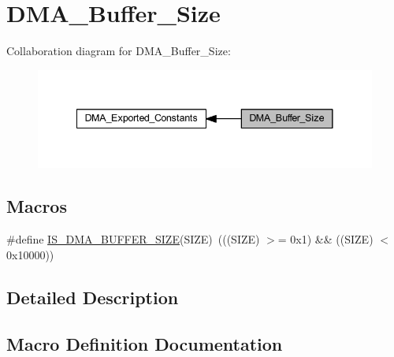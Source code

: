 \hypertarget{group___d_m_a___buffer___size}{}\section{D\+M\+A\+\_\+\+Buffer\+\_\+\+Size}
\label{group___d_m_a___buffer___size}
Collaboration diagram for D\+M\+A\+\_\+\+Buffer\+\_\+\+Size\+:
\nopagebreak
\begin{figure}[H]
\begin{center}
\leavevmode
\includegraphics[width=341pt]{group___d_m_a___buffer___size}
\end{center}
\end{figure}
\subsection*{Macros}
\begin{DoxyCompactItemize}
\item 
\#define \hyperlink{group___d_m_a___buffer___size_ga72ef4033bb3bc2cdfdbe579083b05e32}{I\+S\+\_\+\+D\+M\+A\+\_\+\+B\+U\+F\+F\+E\+R\+\_\+\+S\+I\+ZE}(S\+I\+ZE)~(((S\+I\+ZE) $>$= 0x1) \&\& ((\+S\+I\+Z\+E) $<$ 0x10000))
\end{DoxyCompactItemize}


\subsection{Detailed Description}


\subsection{Macro Definition Documentation}
\mbox{\label{group___d_m_a___buffer___size_ga72ef4033bb3bc2cdfdbe579083b05e32}} 

